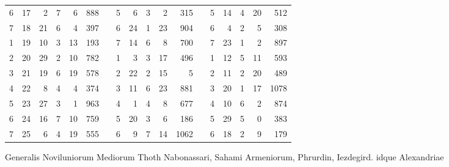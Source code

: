 \begin{tabnums}
\begin{tabular}[c]{@{} r r r rrr c r r rrr c r r rrr @{}}
\midrule
6 & 17 &  2 &  7& 6& 888 && 5 &  6 & 3& 2& 315 && 5 & 14 & 4&20& 512 \\
7 & 18 & 21 &  6& 4& 397 && 6 & 24 & 1&23& 904 && 6 &  4 & 2& 5& 308 \\
1 & 19 & 10 &  3&13& 193 && 7 & 14 & 6& 8& 700 && 7 & 23 & 1& 2& 897 \\
2 & 20 & 29 &  2&10& 782 && 1 &  3 & 3&17& 496 && 1 & 12 & 5&11& 593 \\
\midrule
3 & 21 & 19 &  6&19& 578 && 2 & 22 & 2&15&   5 && 2 & 11 & 2&20& 489 \\
4 & 22 &  8 &  4& 4& 374 && 3 & 11 & 6&23& 881 && 3 & 20 & 1&17&1078 \\
5 & 23 & 27 &  3& 1& 963 && 4 &  1 & 4& 8& 677 && 4 & 10 & 6& 2& 874 \\
6 & 24 & 16 &  7&10& 759 && 5 & 20 & 3& 6& 186 && 5 & 29 & 5& 0& 383 \\
7 & 25 &  6 &  4&19& 555 && 6 &  9 & 7&14&1062 && 6 & 18 & 2& 9& 179 \\
\bottomrule
\end{tabular}
\caption{Generalis Noviluniorum Mediorum Thoth Nabonassari, Sahami Armeniorum, Phrurdin, Iezdegird. idque Alexandriae}
\label{tab:p218b}
\end{tabnums}
